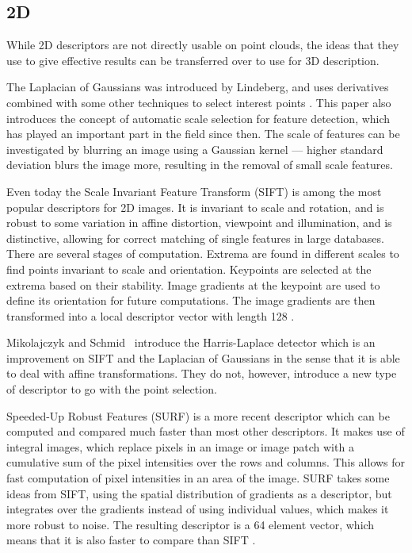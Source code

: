 \documentclass[11pt,a4paper]{kth-mag}
\begin{document}
\subsection{2D}
While 2D descriptors are not directly usable on point clouds, the ideas that
they use to give effective results can be transferred over to use for 3D
description.

The Laplacian of Gaussians was introduced by Lindeberg, and uses derivatives
combined with some other techniques to select interest points \cite{lindeberg1998feature}. This paper also introduces the concept of automatic
scale selection for feature detection, which has played an important part in the
field since then. The scale of features can be investigated by blurring an image
using a Gaussian kernel --- higher standard deviation blurs the image more,
resulting in the removal of small scale features.

Even today the Scale Invariant Feature Transform (SIFT) is among the most
popular descriptors for 2D images. It is invariant to scale and rotation, and is
robust to some variation in affine distortion, viewpoint and illumination, and
is distinctive, allowing for correct matching of single features in large
databases. There are several stages of computation. Extrema are found in
different scales to find points invariant to scale and orientation. Keypoints
are selected at the extrema based on their stability. Image gradients at the
keypoint are used to define its orientation for future computations. The image
gradients are then transformed into a local descriptor vector with length 128
\cite{lowe2004distinctive}.

Mikolajczyk and Schmid~\cite{mikolajczyk2004scale} introduce the Harris-Laplace
detector which is an improvement on SIFT \cite{lowe2004distinctive} and the
Laplacian of Gaussians \cite{lindeberg1998feature} in the sense that it is able
to deal with affine transformations. They do not, however, introduce a new type
of descriptor to go with the point selection. 

Speeded-Up Robust Features (SURF) is a more recent descriptor which can be
computed and compared much faster than most other descriptors. It makes use of
integral images, which replace pixels in an image or image patch with a
cumulative sum of the pixel intensities over the rows and columns. This allows
for fast computation of pixel intensities in an area of the image. SURF takes
some ideas from SIFT, using the spatial distribution of gradients as a
descriptor, but integrates over the gradients instead of using individual
values, which makes it more robust to noise. The resulting descriptor is a 64
element vector, which means that it is also faster to compare than SIFT
\cite{bay2008speeded}.
\end{document}
